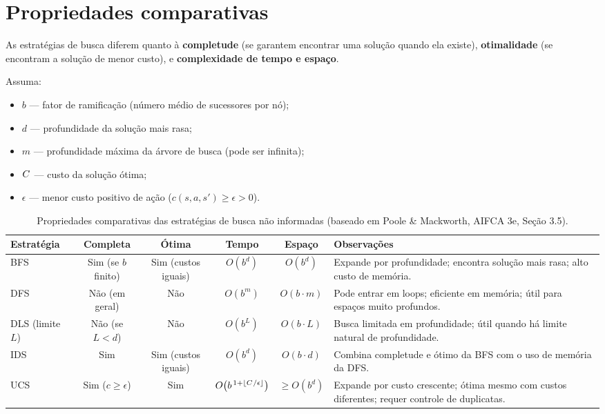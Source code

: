 \documentclass[9pt,a4paper]{extarticle}
\begin{document}
\section{Propriedades comparativas}

As estratégias de busca diferem quanto à \textbf{completude} (se garantem encontrar uma solução quando ela existe),  
\textbf{otimalidade} (se encontram a solução de menor custo), e  
\textbf{complexidade de tempo e espaço}.  

Assuma:
\begin{itemize}
  \item $b$ — fator de ramificação (número médio de sucessores por nó);
  \item $d$ — profundidade da solução mais rasa;
  \item $m$ — profundidade máxima da árvore de busca (pode ser infinita);
  \item $C^{\*}$ — custo da solução ótima;
  \item $\epsilon$ — menor custo positivo de ação ($c(s,a,s') \ge \epsilon > 0$).
\end{itemize}

\begin{table}[h]
\centering
\small
\setlength{\tabcolsep}{4pt}
\renewcommand{\arraystretch}{1.2}
\begin{tabular}{@{}lccccp{6.5cm}@{}}
\toprule
\textbf{Estratégia} & \textbf{Completa} & \textbf{Ótima} & \textbf{Tempo} & \textbf{Espaço} & \textbf{Observações} \\ 
\midrule
BFS & Sim (se $b$ finito) & Sim (custos iguais) & $O(b^{d})$ & $O(b^{d})$ & Expande por profundidade; encontra solução mais rasa; alto custo de memória. \\[3pt]
DFS & Não (em geral) & Não & $O(b^{m})$ & $O(b\cdot m)$ & Pode entrar em loops; eficiente em memória; útil para espaços muito profundos. \\[3pt]
DLS (limite $L$) & Não (se $L<d$) & Não & $O(b^{L})$ & $O(b\cdot L)$ & Busca limitada em profundidade; útil quando há limite natural de profundidade. \\[3pt]
IDS & Sim & Sim (custos iguais) & $O(b^{d})$ & $O(b\cdot d)$ & Combina completude e ótimo da BFS com o uso de memória da DFS. \\[3pt]
UCS & Sim ($c\ge\epsilon$) & Sim & $O\!\left(b^{\,1+\lfloor C^{\*}/\epsilon \rfloor}\right)$ & $\ge O(b^{d})$ & Expande por custo crescente; ótima mesmo com custos diferentes; requer controle de duplicatas. \\
\bottomrule
\end{tabular}
\caption{Propriedades comparativas das estratégias de busca não informadas (baseado em Poole \& Mackworth, AIFCA 3e, Seção 3.5).}
\end{table}
\end{document}
